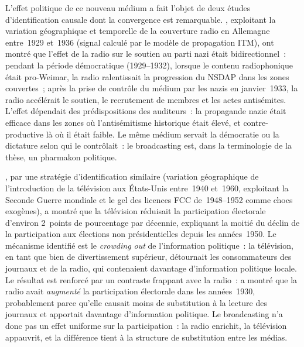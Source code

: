 L'effet politique de ce nouveau médium a fait l'objet de deux études d'identification causale dont la convergence est remarquable. \textcite{adena_radio_2015}, exploitant la variation géographique et temporelle de la couverture radio en Allemagne entre~1929 et~1936 (signal calculé par le modèle de propagation ITM), ont montré que l'effet de la radio sur le soutien au parti nazi était bidirectionnel~: pendant la période démocratique (1929--1932), lorsque le contenu radiophonique était pro-Weimar, la radio ralentissait la progression du NSDAP dans les zones couvertes~; après la prise de contrôle du médium par les nazis en janvier~1933, la radio accélérait le soutien, le recrutement de membres et les actes antisémites. L'effet dépendait des prédispositions des auditeurs~: la propagande nazie était efficace dans les zones où l'antisémitisme historique était élevé, et contre-productive là où il était faible. Le même médium servait la démocratie ou la dictature selon qui le contrôlait~: le broadcasting est, dans la terminologie de la thèse, un pharmakon politique.

%
\textcite{gentzkow_television_2006}, par une stratégie d'identification similaire (variation géographique de l'introduction de la télévision aux États-Unis entre~1940 et~1960, exploitant la Seconde Guerre mondiale et le gel des licences FCC de~1948--1952 comme chocs exogènes), a montré que la télévision réduisait la participation électorale d'environ 2~points de pourcentage par décennie, expliquant la moitié du déclin de la participation aux élections non présidentielles depuis les années~1950. Le mécanisme identifié est le \emph{crowding out} de l'information politique~: la télévision, en tant que bien de divertissement supérieur, détournait les consommateurs des journaux et de la radio, qui contenaient davantage d'information politique locale. Le résultat est renforcé par un contraste frappant avec la radio~: \textcite{stromberg_radio_2004} a montré que la radio avait \emph{augmenté} la participation électorale dans les années~1930, probablement parce qu'elle causait moins de substitution à la lecture des journaux et apportait davantage d'information politique. Le broadcasting n'a donc pas un effet uniforme sur la participation~: la radio enrichit, la télévision appauvrit, et la différence tient à la structure de substitution entre les médias.



